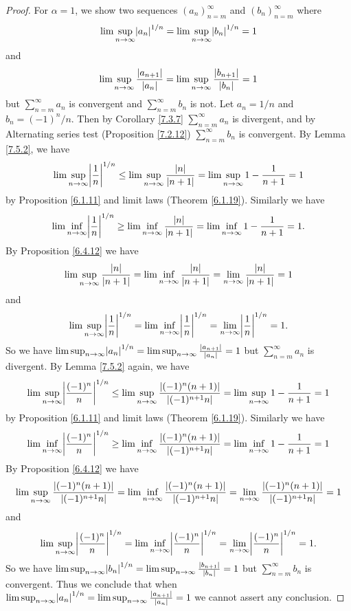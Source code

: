 \begin{proof}
For \(\alpha = 1\), we show two sequences \((a_n)_{n = m}^\infty\) and \((b_n)_{n = m}^\infty\) where
\[
    \lim\sup_{n \to \infty} \abs*{a_n}^{1 / n} = \lim\sup_{n \to \infty} \abs*{b_n}^{1 / n} = 1
\]
and
\[
    \lim\sup_{n \to \infty} \frac{\abs*{a_{n + 1}}}{\abs*{a_n}} = \lim\sup_{n \to \infty} \frac{\abs*{b_{n + 1}}}{\abs*{b_n}} = 1
\]
but \(\sum_{n = m}^\infty a_n\) is convergent and \(\sum_{n = m}^\infty b_n\) is not.
Let \(a_n = 1 / n\) and \(b_n = (-1)^n / n\).
Then by Corollary \ref{7.3.7} \(\sum_{n = m}^\infty a_n\) is divergent, and by Alternating series test (Proposition \ref{7.2.12}) \(\sum_{n = m}^\infty b_n\) is convergent.
By Lemma \ref{7.5.2}, we have
\[
    \lim\sup_{n \to \infty} \abs*{\frac{1}{n}}^{1 / n} \leq \lim\sup_{n \to \infty} \frac{\abs*{n}}{\abs*{n + 1}} = \lim\sup_{n \to \infty} 1 - \frac{1}{n + 1} = 1
\]
by Proposition \ref{6.1.11} and limit laws (Theorem \ref{6.1.19}).
Similarly we have
\[
    \lim\inf_{n \to \infty} \abs*{\frac{1}{n}}^{1 / n} \geq \lim\inf_{n \to \infty} \frac{\abs*{n}}{\abs*{n + 1}} = \lim\inf_{n \to \infty} 1 - \frac{1}{n + 1} = 1.
\]
By Proposition \ref{6.4.12} we have
\[
    \lim\sup_{n \to \infty} \frac{\abs*{n}}{\abs*{n + 1}} = \lim\inf_{n \to \infty} \frac{\abs*{n}}{\abs*{n + 1}} = \lim_{n \to \infty} \frac{\abs*{n}}{\abs*{n + 1}} = 1
\]
and
\[
    \lim\sup_{n \to \infty} \abs*{\frac{1}{n}}^{1 / n} = \lim\inf_{n \to \infty} \abs*{\frac{1}{n}}^{1 / n} = \lim_{n \to \infty} \abs*{\frac{1}{n}}^{1 / n} = 1.
\]
So we have \(\lim\sup_{n \to \infty} \abs*{a_n}^{1 / n} = \lim\sup_{n \to \infty} \frac{\abs*{a_{n + 1}}}{\abs*{a_n}} = 1\) but \(\sum_{n = m}^\infty a_n\) is divergent.
By Lemma \ref{7.5.2} again, we have
\[
    \lim\sup_{n \to \infty} \abs*{\frac{(-1)^n}{n}}^{1 / n} \leq \lim\sup_{n \to \infty} \frac{\abs*{(-1)^n (n + 1)}}{\abs*{(-1)^{n + 1} n}} = \lim\sup_{n \to \infty} 1 - \frac{1}{n + 1} = 1
\]
by Proposition \ref{6.1.11} and limit laws (Theorem \ref{6.1.19}).
Similarly we have
\[
    \lim\inf_{n \to \infty} \abs*{\frac{(-1)^n}{n}}^{1 / n} \geq \lim\inf_{n \to \infty} \frac{\abs*{(-1)^n (n + 1)}}{\abs*{(-1)^{n + 1} n}} = \lim\inf_{n \to \infty} 1 - \frac{1}{n + 1} = 1
\]
By Proposition \ref{6.4.12} we have
\[
    \lim\sup_{n \to \infty} \frac{\abs*{(-1)^n (n + 1)}}{\abs*{(-1)^{n + 1} n}} = \lim\inf_{n \to \infty} \frac{\abs*{(-1)^n (n + 1)}}{\abs*{(-1)^{n + 1} n}} = \lim_{n \to \infty} \frac{\abs*{(-1)^n (n + 1)}}{\abs*{(-1)^{n + 1} n}} = 1
\]
and
\[
    \lim\sup_{n \to \infty} \abs*{\frac{(-1)^n}{n}}^{1 / n} = \lim\inf_{n \to \infty} \abs*{\frac{(-1)^n}{n}}^{1 / n} = \lim_{n \to \infty} \abs*{\frac{(-1)^n}{n}}^{1 / n} = 1.
\]
So we have \(\lim\sup_{n \to \infty} \abs*{b_n}^{1 / n} = \lim\sup_{n \to \infty} \frac{\abs*{b_{n + 1}}}{\abs*{b_n}} = 1\) but \(\sum_{n = m}^\infty b_n\) is convergent.
Thus we conclude that when \(\lim\sup_{n \to \infty} \abs*{a_n}^{1 / n} = \lim\sup_{n \to \infty} \frac{\abs*{a_{n + 1}}}{\abs*{a_n}} = 1\) we cannot assert any conclusion.
\end{proof}

